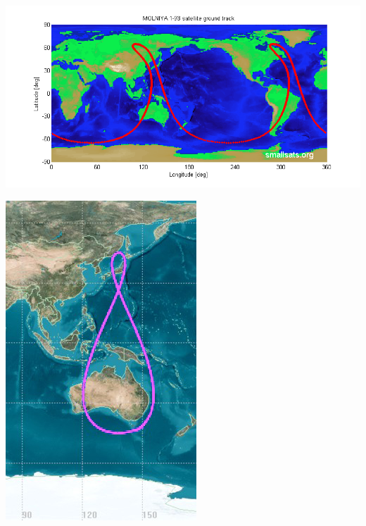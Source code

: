 \documentclass[12pt]{article}
\begin{document}
    \includegraphics[width = \linewidth]{groundtrack_01.png}

    \includegraphics[width = 0.8\linewidth]{tundra.jpeg}
\end{document}
